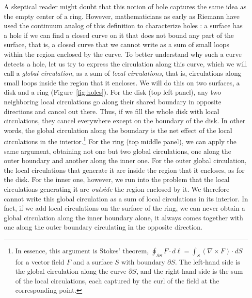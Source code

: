 \documentclass[11pt,a4paper]{article}
\theoremstyle{plain}
\theoremstyle{definition}
\begin{document}
A skeptical reader might doubt that this notion of hole captures the same idea as the empty center of a ring. However, mathematicians as early as Riemann have used the continuum analog of this definition to characterize holes \cite{riemann1857}: a surface has a hole if we can find a closed curve on it that does not bound any part of the surface, that is, a closed curve that we cannot write as a sum of small loops within the region enclosed by the curve. To better understand why such a curve detects a hole, let us try to express the circulation along this curve, which we will call a \emph{global circulation}, as a sum of \emph{local circulations}, that is, circulations along small loops inside the region that it encloses. We will do this on two surfaces, a disk and a ring (Figure~\ref{fig:holes}). For the disk (top left panel), any two neighboring local circulations go along their shared boundary in opposite directions and cancel out there. Thus, if we fill the whole disk with local circulations, they cancel everywhere except on the boundary of the disk. In other words, the global circulation along the boundary is the net effect of the local circulations in the interior.\footnote{In essence, this argument is Stokes' theorem, $\oint_{\partial S}F\cdot d\ell=\int_S(\nabla\times F)\cdot dS$ for a vector field $F$ and a surface $S$ with boundary $\partial S$. The left-hand side is the global circulation along the curve $\partial S$, and the right-hand side is the sum of the local circulations, each captured by the curl of the field at the corresponding point.} For the ring (top middle panel), we can apply the same argument, obtaining not one but two global circulations, one along the outer boundary and another along the inner one. For the outer global circulation, the local circulations that generate it are inside the region that it encloses, as for the disk. For the inner one, however, we run into the problem that the local circulations generating it are \emph{outside} the region enclosed by it. We therefore cannot write this global circulation as a sum of local circulations in its interior. In fact, if we add local circulations on the surface of the ring, we can never obtain a global circulation along the inner boundary alone, it always comes together with one along the outer boundary circulating in the opposite direction. 
\end{document}
